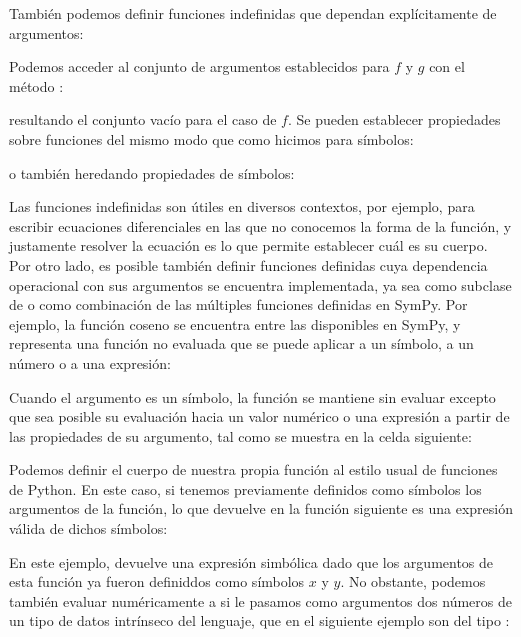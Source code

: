 También podemos definir funciones indefinidas que dependan explícitamente de argumentos:


Podemos acceder al conjunto de argumentos establecidos para $f$ y $g$ con el método :

\noindent resultando el conjunto vacío para el caso de $f$. Se pueden establecer propiedades sobre funciones del mismo modo que como hicimos para símbolos:

\noindent o también heredando propiedades de símbolos:


Las funciones indefinidas son útiles en diversos contextos, por ejemplo, para escribir ecuaciones diferenciales en las que no conocemos la forma de la función, y justamente resolver la ecuación es lo que permite establecer cuál es su cuerpo. Por otro lado, es posible también definir funciones definidas cuya dependencia operacional con sus argumentos se encuentra implementada, ya sea como subclase de  o como combinación de las múltiples funciones definidas en SymPy. Por ejemplo, la función coseno se encuentra entre las disponibles en SymPy, y representa una función no evaluada que se puede aplicar a un símbolo, a un número o a una expresión:


Cuando el argumento es un símbolo, la función se mantiene sin evaluar excepto que sea posible su evaluación hacia un valor numérico o una expresión a partir de las propiedades de su argumento, tal como se muestra en la celda siguiente:


Podemos definir el cuerpo de nuestra propia función al estilo usual de funciones de Python. En este caso, si tenemos previamente definidos como símbolos los argumentos de la función, lo que devuelve  en la función  siguiente es una expresión válida de dichos símbolos:


En este ejemplo,  devuelve una expresión simbólica dado que los argumentos de esta función ya fueron definiddos como símbolos $x$ y $y$. No obstante, podemos también evaluar numéricamente a  si le pasamos como argumentos dos números de un tipo de datos intrínseco del lenguaje, que en el siguiente ejemplo son del tipo :

